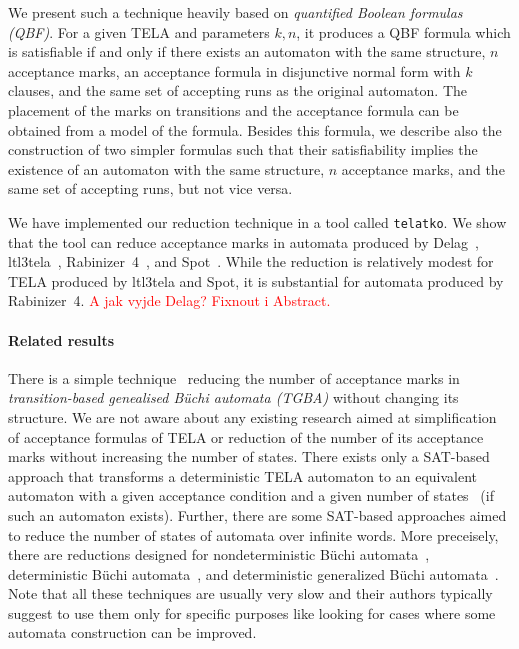 \documentclass[a4paper,UKenglish,cleveref, autoref, thm-restate]{lipics-v2021}
\newcommand{\todo}[1]{\textcolor{red}{#1}}
\newcommand{\telatko}{\texttt{telatko}\xspace}
\begin{document}
We present such a technique heavily based on \emph{quantified Boolean
  formulas (QBF)}. For a given TELA and parameters $k,n$, it produces
a QBF formula which is satisfiable if and only if there exists an
automaton with the same structure, $n$ acceptance marks, an acceptance
formula in disjunctive normal form with $k$ clauses, and the same set
of accepting runs as the original automaton. The placement of the
marks on transitions and the acceptance formula can be obtained from a
model of the formula. Besides this formula, we describe also the
construction of two simpler formulas such that their satisfiability
implies the existence of an automaton with the same structure, $n$
acceptance marks, and the same set of accepting runs, but not vice
versa.

We have implemented our reduction technique in a tool called
\telatko. We show that the tool can reduce acceptance marks in
automata produced by Delag~\cite{muller.17.gandalf},
ltl3tela~\cite{major.19.atva}, Rabinizer~4~\cite{kretinsky.18.cav},
and Spot~\cite{duret.16.atva2}.  While the reduction is relatively
modest for TELA produced by ltl3tela and Spot, it is substantial for
automata produced by Rabinizer~4. \todo{A jak vyjde Delag? Fixnout i
  Abstract.}

\paragraph*{Related results}
There is a simple technique~\cite{babiak.13.spin} reducing the number
of acceptance marks in \emph{transition-based genealised Büchi
  automata (TGBA)} without changing its structure. We are not aware
about any existing research aimed at simplification of acceptance
formulas of TELA or reduction of the number of its acceptance marks
without increasing the number of states. There exists only a SAT-based
approach that transforms a deterministic TELA automaton to an
equivalent automaton with a given acceptance condition and a given
number of states~\cite{baarir.15.lpar} (if such an automaton
exists). Further, there are some SAT-based approaches aimed to reduce
the number of states of automata over infinite words. More preceisely,
there are reductions designed for nondeterministic Büchi
automata~\cite{ehlers.10.spin}, deterministic Büchi
automata~\cite{ehlers.10.sat}, and deterministic generalized Büchi
automata~\cite{baarir.14.forte}. Note that all these techniques are
usually very slow and their authors typically suggest to use them only
for specific purposes like looking for cases where some automata
construction can be improved.
\end{document}
